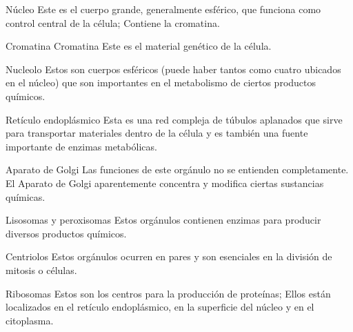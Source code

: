 \documentclass{beamer}
\begin{document}

\begin{frame}

  \begin{block}{Núcleo}
	Este es el cuerpo grande, generalmente esférico, que funciona como control central de la célula; Contiene la cromatina.
  \end{block}

  \begin{block}{Cromatina}
	Cromatina Este es el material genético de la célula.
  \end{block}

  \begin{block}{Nucleolo}
	 Estos son cuerpos esféricos (puede haber tantos como cuatro ubicados en el núcleo) que son importantes en el metabolismo de ciertos productos químicos.
  \end{block}

\end{frame}


\begin{frame}

  \begin{block}{Retículo endoplásmico}
	Esta es una red compleja de túbulos aplanados que sirve para transportar materiales dentro de la célula y es también una fuente importante de enzimas metabólicas.
  \end{block}

  \begin{block}{Aparato de Golgi}
	Las funciones de este orgánulo no se entienden completamente. El Aparato de Golgi aparentemente concentra y modifica ciertas sustancias químicas.
  \end{block}
	
\end{frame}


\begin{frame}
	
  \begin{block}{Lisosomas y peroxisomas}
	Estos orgánulos contienen enzimas para producir diversos productos químicos.
  \end{block}

  \begin{block}{Centriolos}
	Estos orgánulos ocurren en pares y son esenciales en la división de mitosis o células.
  \end{block}

  \begin{block}{Ribosomas}
	Estos son los centros para la producción de proteínas; Ellos están localizados en el retículo endoplásmico, en la superficie del núcleo y en el citoplasma.
  \end{block}
	
\end{frame}
\end{document}
